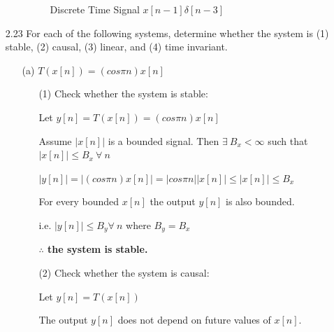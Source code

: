 \documentclass[fleqn]{article}
\begin{document}
\begin{enumerate}[nolistsep]
\begin{enumerate}[nolistsep]
		\renewcommand{\thefigure}{P2.21-E-3}
		
		\begin{figure}[H]
			\centerline{}
		\caption{Discrete Time Signal $x[n-1]\delta[n-3]$}
		\label{part_e}
		\end{figure}
		
		\end{enumerate}
		
		\item[2.23] For each of the following systems, determine whether the system is (1) stable, (2) causal, (3) linear, and (4) time invariant.
		
		\begin{enumerate}[nolistsep]
			\item[(a)] $T(x[n]) = (cos{\pi}n)x[n]$
			
				\begin{enumerate}[nolistsep]
				
					\item[(1)] Check whether the system is stable:
			
					Let $y[n] = T(x[n]) = (cos{\pi}n)x[n]$
			
					Assume $|x[n]|$ is a bounded signal. Then $\exists\ B_x < \infty$ such that  $|x[n]| \leq B_x\ \forall\ n$
			
					$|y[n]| = |(cos{\pi}n)x[n]| = |cos{\pi}n||x[n]| \leq |x[n]| \leq B_x$
			
					For every bounded $x[n]$ the output $y[n]$ is also bounded.
					
					i.e. $|y[n]| \leq B_y \forall\ n$ where $B_y = B_x$					
			
					\textbf{$\mathbf{\therefore}$ the system is stable.}
					
					\item[(2)] Check whether the system is causal:
					
					Let $y[n] = T(x[n])$
					
					The output $y[n]$ does not depend on future values of $x[n]$.
					

\end{enumerate}
\end{enumerate}
\end{enumerate}
\end{document}

